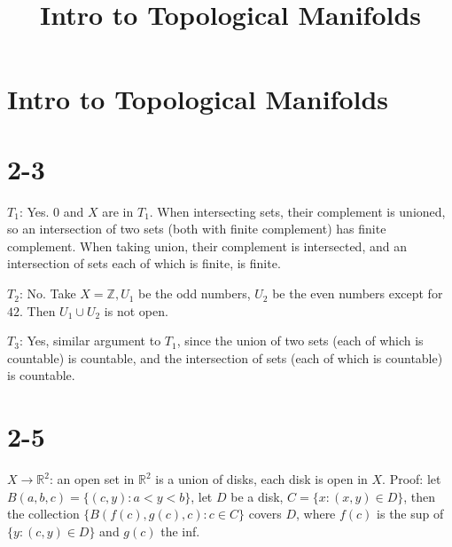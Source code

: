 \documentclass{article}
\title{Intro to Topological Manifolds}
\date{}
\def\Z{\mathbb{Z}}
\def\R{\mathbb{R}}
\begin{document}
\maketitle

\section*{Intro to Topological Manifolds}

\section*{2-3}

$T_1$: Yes. $0$ and $X$ are in $T_1$. When intersecting sets, their complement is unioned, so an intersection of two sets (both with finite complement) has finite complement. When taking union, their complement is intersected, and an intersection of sets each of which is finite, is finite.

$T_2$: No. Take $X = \Z, U_1$ be the odd numbers, $U_2$ be the even numbers except for $42$. Then $U_1 \cup U_2$ is not open.

$T_3$: Yes, similar argument to $T_1$, since the union of two sets (each of which is countable) is countable, and the intersection of sets (each of which is countable) is countable.

\section*{2-5}

$X \to \R^2$: an open set in $\R^2$ is a union of disks, each disk is open in $X$. Proof: let $B(a, b, c) = \{ (c, y) : a < y < b \}$, let $D$ be a disk, $C = \{ x : (x, y) \in D\}$, then the collection $\{B(f(c), g(c), c) : c \in C\}$ covers $D$, where $f(c)$ is the sup of $\{y : (c, y) \in D\}$ and $g(c)$ the inf.
\end{document}
